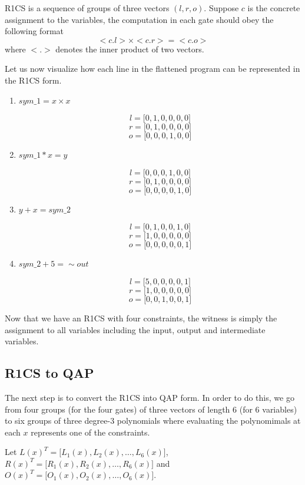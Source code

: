 \documentclass[twoside]{article}
\begin{document}
R1CS is a sequence of groups of three vectors $(l, r, o)$. Suppose $c$ is the concrete assignment to the variables, the computation in each 
gate should obey the following format
$$<c.l> \times <c.r> = <c.o>$$ where $<.>$ denotes the inner product of two vectors.

Let us now visualize how each line in the flattened program can be represented in the R1CS form.

\begin{enumerate}
\item
{\bf $sym\text{\_}1 = x \times x$}


$$ l = \lbrack 0, 1, 0, 0, 0, 0 \rbrack $$ 
$$ r = \lbrack 0, 1, 0, 0, 0, 0 \rbrack $$
$$ o = \lbrack 0, 0, 0, 1, 0, 0 \rbrack $$


\item 
{\bf $sym\text{\_}1 * x = y$}

$$ l = \lbrack 0, 0, 0, 1, 0, 0 \rbrack $$ 
$$ r = \lbrack 0, 1, 0, 0, 0, 0 \rbrack $$
$$ o = \lbrack 0, 0, 0, 0, 1, 0 \rbrack $$

\item 
{\bf $y + x = sym\text{\_}2$}

$$ l = \lbrack 0, 1, 0, 0, 1, 0 \rbrack $$ 
$$ r = \lbrack 1, 0, 0, 0, 0, 0 \rbrack $$
$$ o = \lbrack 0, 0, 0, 0, 0, 1 \rbrack $$

\item
{\bf $sym\text{\_}2 + 5 = \sim out$}

$$ l = \lbrack 5, 0, 0, 0, 0, 1 \rbrack $$ 
$$ r = \lbrack 1, 0, 0, 0, 0, 0 \rbrack $$
$$ o = \lbrack 0, 0, 1, 0, 0, 1 \rbrack $$

\end{enumerate}

Now that we have an R1CS with four constraints, the witness is simply the assignment to all variables including the input, output 
and intermediate variables.


\subsection{R1CS to QAP}
The next step is to convert the R1CS into QAP form. In order to do this, we go from four groups (for the four gates) of three vectors
of length 6 (for 6 variables) to six groups of three degree-3 polynomials where evaluating the polynomimals at each $x$ represents one of the
constraints.

Let $L(x)^{T} = \lbrack L_1(x), L_2(x), \ldots, L_6(x) \rbrack$, $R(x)^{T} = \lbrack R_1(x), R_2(x), \ldots, R_6(x) \rbrack$ and 
$O(x)^{T} = \lbrack O_1(x), O_2(x), \ldots, O_6(x) \rbrack$. 
\end{document}
